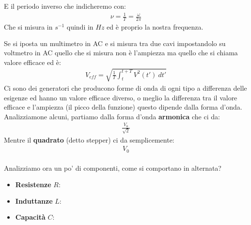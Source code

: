 \documentclass[a4paper, oneside]{article}
\begin{document}
E il periodo inverso che indicheremo con:
\begin{gather*}
    \nu = \frac{1}{T} = \frac{\omega}{2\pi}
\end{gather*}
Che si misura in $s^{-1}$ quindi in $Hz$ ed è proprio la nostra frequenza.\\
\begin{center}
\end{center}
Se si iposta un multimetro in AC e si misura tra due cavi impostandolo su voltmetro in AC quello che si misura non è l'ampiezza ma quello che si chiama valore efficace ed è:
\begin{gather*}
    V_{eff} = \sqrt{\frac{1}{T} \int_{t}^{t+T} V^2(t') \ dt'}
\end{gather*}
Ci sono dei generatori che producono forme di onda di ogni tipo a differenza delle esigenze ed hanno un valore efficace diverso, o meglio la differenza tra il valore efficace e l'ampiezza (il picco della funzione) questo dipende dalla forma d'onda.\\
Analizziamone alcuni, partiamo dalla forma d'onda \textbf{armonica} che ci da:
\begin{gather*}
    \frac{V_0}{\sqrt{2}}
\end{gather*}
Mentre il \textbf{quadrato} (detto stepper) ci da semplicemente:
\begin{gather*}
    V_0
\end{gather*}
\hfill\\
Analizziamo ora un po' di componenti, come si comportano in alternata?\\
\begin{itemize}
    \item \textbf{Resistenze} $R$:
    \item \textbf{Induttanze} $L$:
    \item \textbf{Capacità} $C$:
\end{itemize}
\end{document}
